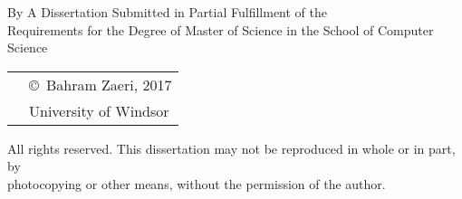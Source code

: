 \pagebreak
{
\centering
\thesistitle
\tpbreak
By
\tpbreak
\nameanddegrees
\tpbreak
A Dissertation Submitted in Partial Fulfillment of the \\
Requirements for the Degree of
\tpbreak
Master of Science
\tpbreak
in the School of Computer Science\\
\vfill
\begin{tabular}{cl}
& \copyright\ Bahram Zaeri, 2017\\
& \phantom{\copyright} University of Windsor
\end{tabular}
\tpbreak
All rights reserved. This dissertation may not be reproduced in whole or in part, by \\
\hfill photocopying or other means, without the permission of the author. 
\hfill
}
\pagebreak
